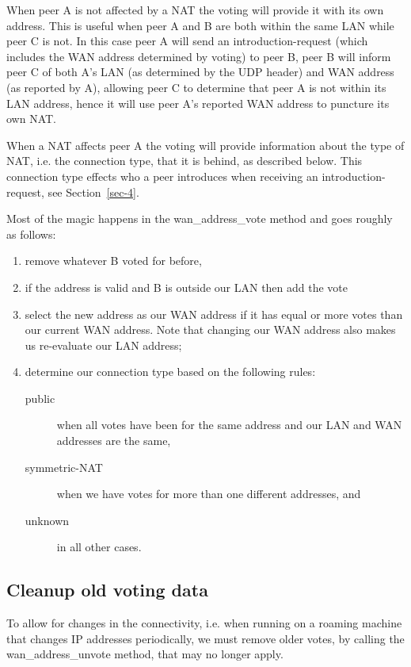 When peer A is not affected by a NAT the voting will provide it with
its own address.  This is useful when peer A and B are both within the
same LAN while peer C is not.  In this case peer A will send an
introduction-request (which includes the WAN address determined by
voting) to peer B, peer B will inform peer C of both A’s LAN (as
determined by the UDP header) and WAN address (as reported by A),
allowing peer C to determine that peer A is not within its LAN
address, hence it will use peer A’s reported WAN address to puncture
its own NAT.

When a NAT affects peer A the voting will provide information about
the type of NAT, i.e. the connection type, that it is behind, as
described below.  This connection type effects who a peer introduces
when receiving an introduction-request, see Section~\ref{sec-4}.

Most of the magic happens in the wan\_address\_vote method\footnotemark[5]{}
and goes roughly as follows:
\begin{enumerate}
\item remove whatever B voted for before,
\item if the address is valid and B is outside our LAN then add the vote
\item select the new address as our WAN address if it has equal or more
votes than our current WAN address.  Note that changing our WAN
address also makes us re-evaluate our LAN address;
\item determine our connection type based on the following rules:
\begin{description}
\item[{public}] when all votes have been for the same address and our
LAN and WAN addresses are the same,
\item[{symmetric-NAT}] when we have votes for more than one different
addresses, and
\item[{unknown}] in all other cases.
\end{description}
\end{enumerate}

\subsection{Cleanup old voting data}
\label{sec-6-1}
To allow for changes in the connectivity, i.e. when running on a
roaming machine that changes IP addresses periodically, we must remove
older votes, by calling the wan\_address\_unvote method\footnotemark[5]{},
that may no longer apply.

